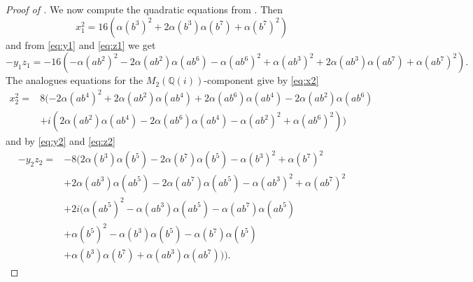 \documentclass[a4paper,10pt]{amsart}
\theoremstyle{definition}
\theoremstyle{remark}
\begin{document}
\begin{proof}[Proof of ]
We now compute the quadratic equations from . Then
\begin{equation}\label{eq:x1^2}
x_1^2 = 16(\alpha(b^3)^2 + 2\alpha(b^3)\alpha(b^7) + \alpha(b^7)^2)
\end{equation}
and from \eqref{eq:y1} and \eqref{eq:z1} we get
\begin{equation}\label{eq:-y1z1}
-y_1z_1 = -16(-\alpha(ab^2)^2 - 2\alpha(ab^2)\alpha(ab^6) - \alpha(ab^6)^2 + \alpha(ab^3)^2 + 2\alpha(ab^3)\alpha(ab^7) + \alpha(ab^7)^2).
\end{equation}
The analogues equations for the $M_2(\mathbb{Q}(i))$-component give by \eqref{eq:x2}
\begin{align}
x_2^2 = & 8(-2\alpha(ab^4)^2 + 2\alpha(ab^2)\alpha(ab^4) + 2\alpha(ab^6)\alpha(ab^4) - 2\alpha(ab^2)\alpha(ab^6) \label{eq:x2^2} \\
& + i(2\alpha(ab^2)\alpha(ab^4) - 2\alpha(ab^6)\alpha(ab^4) - \alpha(ab^2)^2 + \alpha(ab^6)^2 )) \nonumber
\end{align}
and by \eqref{eq:y2} and \eqref{eq:z2}
\begin{align}
-y_2z_2 = & -8(2\alpha(b^3)\alpha(b^5) - 2\alpha(b^7)\alpha(b^5) - \alpha(b^3)^2 + \alpha(b^7)^2 \nonumber \\
 & +2\alpha(ab^3)\alpha(ab^5) -2 \alpha(ab^7)\alpha(ab^5) - \alpha(ab^3)^2 + \alpha(ab^7)^2 \label{eq:-y2z2} \\
& + 2i(\alpha(ab^5)^2 - \alpha(ab^3)\alpha(ab^5) - \alpha(ab^7)\alpha(ab^5) \nonumber \\
 & + \alpha(b^5)^2 - \alpha(b^3)\alpha(b^5) - \alpha(b^7)\alpha(b^5) \nonumber \\
& + \alpha(b^3)\alpha(b^7) + \alpha(ab^3)\alpha(ab^7) )). \nonumber
\end{align}


\end{proof}
\end{document}
